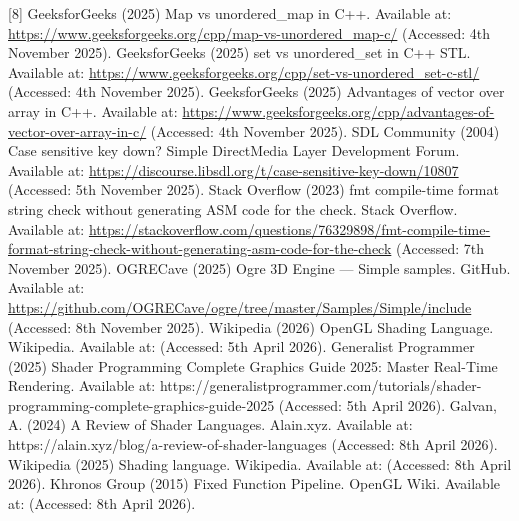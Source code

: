 \documentclass[]{final_report}
\begin{document}
[8] GeeksforGeeks (2025) Map vs unordered\_map in C++. Available at: \url{https://www.geeksforgeeks.org/cpp/map-vs-unordered_map-c/} (Accessed: 4th November 2025). \newline
[9] GeeksforGeeks (2025) set vs unordered\_set in C++ STL. Available at: \url{https://www.geeksforgeeks.org/cpp/set-vs-unordered_set-c-stl/} (Accessed: 4th November 2025). \newline
[10] GeeksforGeeks (2025) Advantages of vector over array in C++. Available at: \url{https://www.geeksforgeeks.org/cpp/advantages-of-vector-over-array-in-c/} (Accessed: 4th November 2025). \newline
[11] SDL Community (2004) Case sensitive key down? Simple DirectMedia Layer Development Forum. Available at: \url{https://discourse.libsdl.org/t/case-sensitive-key-down/10807} (Accessed: 5th November 2025). \newline
[12] Stack Overflow (2023) fmt compile-time format string check without generating ASM code for the check. Stack Overflow. Available at: \url{https://stackoverflow.com/questions/76329898/fmt-compile-time-format-string-check-without-generating-asm-code-for-the-check} (Accessed: 7th November 2025). \newline
[13] OGRECave (2025) Ogre 3D Engine --- Simple samples. GitHub. Available at: \url{https://github.com/OGRECave/ogre/tree/master/Samples/Simple/include} (Accessed: 8th November 2025). \newline
[14] Wikipedia (2026) OpenGL Shading Language. Wikipedia. Available at:  (Accessed: 5th April 2026). \newline
[15] Generalist Programmer (2025) Shader Programming Complete Graphics Guide 2025: Master Real-Time Rendering. Available at: https://generalistprogrammer.com/tutorials/shader-programming-complete-graphics-guide-2025  (Accessed: 5th April 2026). \newline
[16] Galvan, A. (2024) A Review of Shader Languages. Alain.xyz. Available at: https://alain.xyz/blog/a-review-of-shader-languages (Accessed: 8th April 2026). \newline
[17] Wikipedia (2025) Shading language. Wikipedia. Available at: (Accessed: 8th April 2026). \newline
[18] Khronos Group (2015) Fixed Function Pipeline. OpenGL Wiki. Available at:  (Accessed: 8th April 2026). \newline
\end{document}
